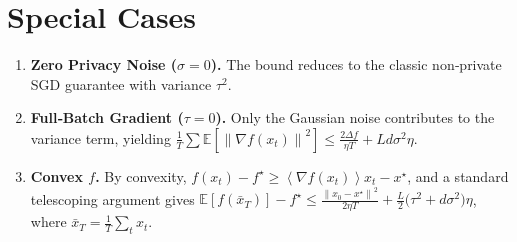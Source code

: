 \documentclass{article}
\newcommand{\E}{\mathbb{E}}
\newcommand{\norm}[1]{\left\|#1\right\|}
\newcommand{\inner}[1]{\left\langle#1\right\rangle}
\begin{document}
\section*{Special Cases}
\begin{enumerate}
\item \textbf{Zero Privacy Noise ($\sigma=0$).} The bound reduces to the classic
non‑private SGD guarantee with variance $\tau^{2}$.
\item \textbf{Full‑Batch Gradient ($\tau=0$).} Only the Gaussian noise contributes to
the variance term, yielding
$\frac{1}{T}\sum\E[\norm{\nabla f(x_{t})}^{2}]
\le \frac{2\Delta f}{\eta T}+L d\sigma^{2}\eta$.
\item \textbf{Convex $f$.} By convexity, $f(x_{t})-f^{\star}\ge\inner{\nabla f(x_{t})}{x_{t}-x^{\star}}$,
and a standard telescoping argument gives
$\E[f(\bar x_{T})]-f^{\star}\le
\frac{\norm{x_{0}-x^{\star}}^{2}}{2\eta T}
+ \frac{L}{2}\big(\tau^{2}+d\sigma^{2}\big)\eta$,
where $\bar x_{T}=\frac{1}{T}\sum_{t}x_{t}$.
\end{enumerate}
\end{document}
